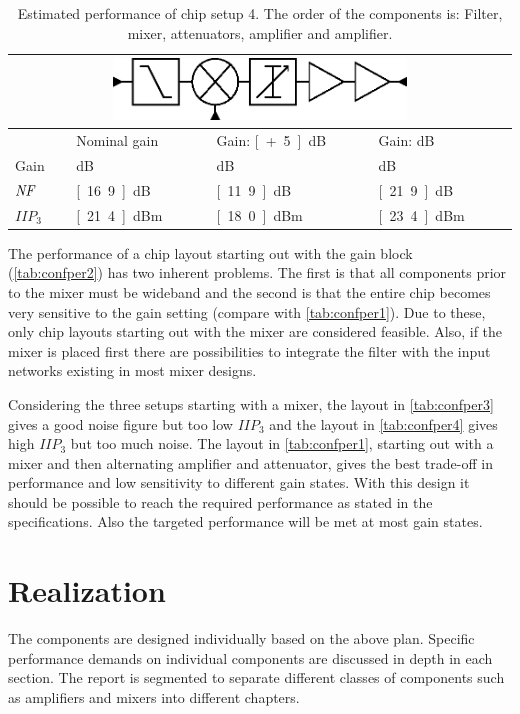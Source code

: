 		\begin{table}[hpt!]
			\caption[Estimated performance of chip setup 4.]{Estimated performance of chip setup 4. The order of the components is: Filter, mixer, attenuators, amplifier and amplifier.}
			\label{tab:confper4}
			\centering
			\begin{tabular}{ l l l l }
				\multicolumn{4}{c}{\includegraphics[width=0.6\textwidth]{fig/system/sys4}} \\\toprule
				& Nominal gain & Gain: \unit[+5]{dB} & Gain: \unit[-5]{dB} \\\midrule
				Gain & \unit[9]{dB} & \unit[14]{dB} & \unit[4]{dB} \\
				$\emph{NF}$ & \unit[16.9]{dB} & \unit[11.9]{dB} & \unit[21.9]{dB} \\
				$IIP_3$ & \unit[21.4]{dBm} & \unit[18.0]{dBm} & \unit[23.4]{dBm} \\\bottomrule
			\end{tabular}
		\end{table}

		The performance of a chip layout starting out with the gain block (\autoref{tab:confper2}) has two inherent problems. The first is that all components prior to the mixer must be wideband and the second is that the entire chip becomes very sensitive to the gain setting (compare with \autoref{tab:confper1}). Due to these, only chip layouts starting out with the mixer are considered feasible. Also, if the mixer is placed first there are possibilities to integrate the filter with the input networks existing in most mixer designs.

		Considering the three setups starting with a mixer, the layout in \autoref{tab:confper3} gives a good noise figure but too low $IIP_3$ and the layout in \autoref{tab:confper4} gives high $IIP_3$ but too much noise. The layout in \autoref{tab:confper1}, starting out with a mixer and then alternating amplifier and attenuator, gives the best trade-off in performance and low sensitivity to different gain states. With this design it should be possible to reach the required performance as stated in the specifications. Also the targeted performance will be met at most gain states.
		
	\section{Realization}
		The components are designed individually based on the above plan. Specific performance demands on individual components are discussed in depth in each section. The report is segmented to separate different classes of components such as amplifiers and mixers into different chapters.
		
